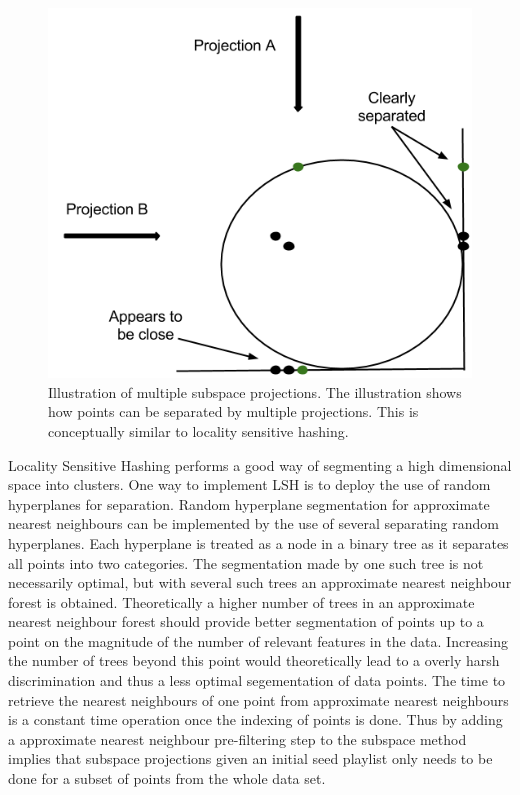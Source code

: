 \documentclass[a4paper,11pt]{kth-mag}
\begin{document}
\begin{figure}
\centering
\includegraphics[scale=0.5]{images/LSH.png}
\caption{Illustration of multiple subspace projections. The illustration shows how points can be separated by multiple projections. This is conceptually similar to locality sensitive hashing.}
\end{figure}


Locality Sensitive Hashing performs a good way of segmenting a high dimensional space into clusters. One way to implement LSH is to deploy the use of random hyperplanes for separation. Random hyperplane segmentation for approximate nearest neighbours can be implemented by the use of several separating random hyperplanes. Each hyperplane is treated as a node in a binary tree as it separates all points into two categories. The segmentation made by one such tree is not necessarily optimal, but with several such trees an approximate nearest neighbour forest is obtained. Theoretically a higher number of trees in an approximate nearest neighbour forest should provide better segmentation of points up to a point on the magnitude of the number of relevant features in the data. Increasing the number of trees beyond this point would theoretically lead to a overly harsh discrimination and thus a less optimal segementation of data points. The time to retrieve the nearest neighbours of one point from approximate nearest neighbours is a constant time operation once the indexing of points is done. Thus by adding a approximate nearest neighbour pre-filtering step to the subspace method implies that subspace projections given an initial seed playlist only needs to be done for a subset of points from the whole data set.
\end{document}
